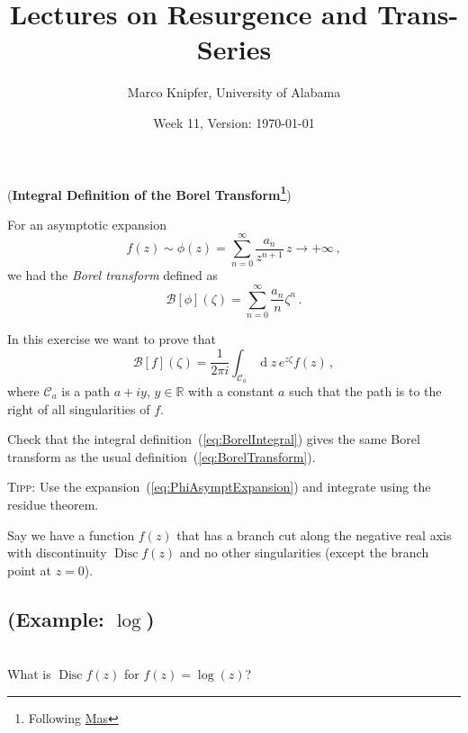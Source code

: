 \documentclass{exam}
\title{Lectures on Resurgence and Trans-Series}
\author{Marco Knipfer, University of Alabama}
\date{Week 11, Version: \today}
\DeclareMathOperator{\diff}{d}
\DeclareMathOperator*{\Disc}{Disc}
\newcommand{\calB}{\mathcal{B}}
\begin{document}
\maketitle

\begin{questions}
    \setcounter{question}{10}
    \question (\textbf{Integral Definition of the Borel Transform\footnote{Following \href{http://arxiv.org/abs/1904.07217}{Mas}}})

    For an asymptotic expansion
    \begin{equation}
        f(z) \sim \phi(z) = \sum_{n=0}^\infty \frac{a_n}{z^{n+1}}\, z\to+\infty\,,
        \label{eq:PhiAsymptExpansion}
    \end{equation}
    we had the \textit{Borel transform} defined as
    \begin{equation}
        \calB[\phi](\zeta) = \sum_{n=0}^\infty \frac{a_n}{n} \zeta^n\,.
        \label{eq:BorelTransform}
    \end{equation}

    In this exercise we want to prove that
    \begin{equation}
        \calB[f](\zeta) = \frac{1}{2\pi i} \int_{\mathcal{C}_a} \diff\!z\, e^{z \zeta} f(z)\,,
        \label{eq:BorelIntegral}
    \end{equation}
    where $\mathcal{C}_a$ is a path $a+iy$, $y\in\mathbb{R}$ with a constant $a$ such that the path is to the right
    of all singularities of $f$.

    Check that the integral definition~(\ref{eq:BorelIntegral}) gives the same Borel transform as the usual
    definition~(\ref{eq:BorelTransform}).

    \textsc{Tipp}: Use the expansion~(\ref{eq:PhiAsymptExpansion}) and integrate using the residue theorem.

    \label{q:Cauchy}
    
    Say we have a function $f(z)$ that has a branch cut along the negative real axis with discontinuity $\Disc f(z)$
    and no other singularities (except the branch point at $z=0$).
    \begin{parts}
        \part{(Example: $\log$)}\\
        What is $\Disc f(z)$ for $f(z) = \log(z)$?


\end{parts}
\end{questions}
\end{document}
